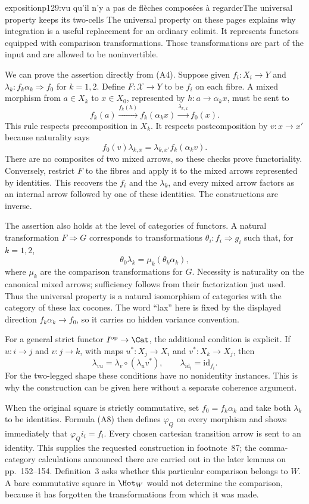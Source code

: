 \begin{dcomment}{exposition}{p129:vu qu'il n'y a pas de flèches composées à regarder}{The universal property keeps its two-cells}
The universal property on these pages explains why integration is a useful replacement for an ordinary colimit.  It represents functors equipped with comparison transformations.  Those transformations are part of the input and are allowed to be noninvertible.

We can prove the assertion directly from (A4).  Suppose given $f_i:X_i\to Y$ and $\lambda_k:f_k\alpha_k\Rightarrow f_0$ for $k=1,2$.  Define $F:\mathcal X\to Y$ to be $f_i$ on each fibre.  A mixed morphism from $a\in X_k$ to $x\in X_0$, represented by $h:a\to\alpha_kx$, must be sent to
\[
 f_k(a)\xrightarrow{f_k(h)}f_k(\alpha_kx)
       \xrightarrow{\lambda_{k,x}}f_0(x).
 \tag{A8}
\]
This rule respects precomposition in $X_k$.  It respects postcomposition by $v:x\to x'$ because naturality says
\[
 f_0(v)\lambda_{k,x}=\lambda_{k,x'}f_k(\alpha_kv).
\]
There are no composites of two mixed arrows, so these checks prove functoriality.  Conversely, restrict $F$ to the fibres and apply it to the mixed arrows represented by identities.  This recovers the $f_i$ and the $\lambda_k$, and every mixed arrow factors as an internal arrow followed by one of these identities.  The constructions are inverse.

The assertion also holds at the level of categories of functors.  A natural transformation $F\Rightarrow G$ corresponds to transformations $\theta_i:f_i\Rightarrow g_i$ such that, for $k=1,2$,
\[
 \theta_0\lambda_k=\mu_k(\theta_k\alpha_k),
\]
where $\mu_k$ are the comparison transformations for $G$.  Necessity is naturality on the canonical mixed arrows; sufficiency follows from their factorization just used.  Thus the universal property is a natural isomorphism of categories with the category of these lax cocones.  The word ``lax'' here is fixed by the displayed direction $f_k\alpha_k\to f_0$, so it carries no hidden variance convention.

For a general strict functor $I^{\mathrm{op}}\to\Cat$, the additional condition is explicit.  If $u:i\to j$ and $v:j\to k$, with maps $u^*:X_j\to X_i$ and $v^*:X_k\to X_j$, then
\[
 \lambda_{vu}=\lambda_v\circ(\lambda_u v^*),
 \qquad \lambda_{\mathrm{id}_i}=\mathrm{id}_{f_i}.
\]
For the two-legged shape these conditions have no nonidentity instances.  This is why the construction can be given here without a separate coherence argument.

When the original square is strictly commutative, set $f_0=f_k\alpha_k$ and take both $\lambda_k$ to be identities.  Formula (A8) then defines $\varphi_Q$ on every morphism and shows immediately that $\varphi_Qi_i=f_i$.  Every chosen cartesian transition arrow is sent to an identity.  This supplies the requested construction in footnote~87; the comma-category calculations announced there are carried out in the later lemmas on pp.~152--154.  Definition~3 asks whether this particular comparison belongs to $W$.  A bare commutative square in $\Hot_W$ would not determine the comparison, because it has forgotten the transformations from which it was made.
\end{dcomment}

